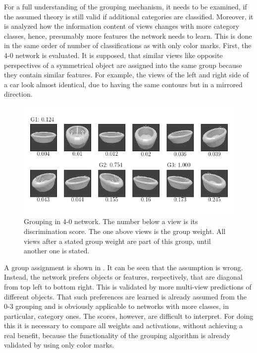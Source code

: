 For a full understanding of the grouping mechanism, it needs to be examined, if the assumed theory is still valid if additional categories are classified.
Moreover, it is analyzed how the information content of views changes with more category classes, hence, presumably more features the network needs to learn.
This is done in the same order of number of classifications as with only color marks.
First, the 4-0 network is evaluated.
It is supposed, that similar views like opposite perspectives of a symmetrical object are assigned into the same group because they contain similar features.
For example, the views of the left and right side of a car look almost identical, due to having the same contours but in a mirrored direction.
\begin{figure}
	\centering
	\includegraphics[trim=10 20 10 20, clip]{images/mn-sl-4-0-20/bathtub_0107_0_grouping.png}
	\caption[Grouping in 4-0 network]{Grouping in 4-0 network. The number below a view is its discrimination score. The one above views is the group weight. All views after a stated group weight are part of this group, until another one is stated.}
	\label{fig:grouping-4-0}
\end{figure}
A group assignment is shown in .
It can be seen that the assumption is wrong.
Instead, the network prefers objects or features, respectively, that are diagonal from top left to bottom right.
This is validated by more multi-view predictions of different objects.
That such preferences are learned is already assumed from the 0-3 grouping and is obviously applicable to networks with more classes, in particular, category ones.
The scores, however, are difficult to interpret.
For doing this it is necessary to compare all weights and activations, without achieving a real benefit, because the functionality of the grouping algorithm is already validated by using only color marks.

